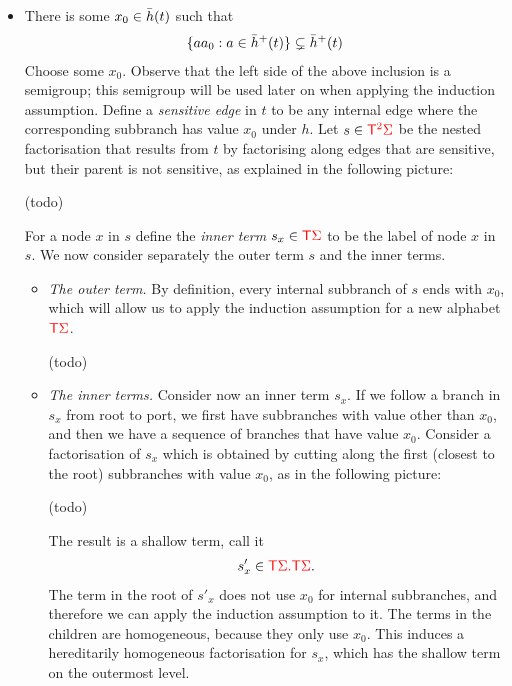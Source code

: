\begin{itemize}
    \item There is some $x_0 \in \bar h(t)$ such that 
    \begin{align}\label{eq:smaller-semigroup}
         \{ a a_0 :  a \in \bar h^+(t)\} \subsetneq  \bar h^+(t)
    \end{align}
    Choose some $x_0$. Observe that the left side of the above inclusion is a semigroup; this semigroup will be used later on when applying the induction assumption. Define a \emph{sensitive edge} in $t$ to be any internal edge where the corresponding subbranch has value $x_0$ under  $h$. Let $s \in {\color{red}{\mathsf T}}^{{\color{red}{2}}} {\color{red}{\Sigma}}$ be the nested factorisation that results from $t$ by factorising along edges that are sensitive, but their parent is not sensitive, as explained in the following picture:
    \begin{center}
        (todo)
    \end{center}
    For a node  $x$ in $s$ define the \emph{inner term} $s_x \in {\color{red}{\mathsf T}}  {\color{red}{\Sigma}}$ to be the label of node $x$ in $s$. We now consider separately the outer term $s$ and the inner terms.
    \begin{itemize}
        \item \emph{The outer term.} By definition, every internal subbranch of $s$ ends with $x_0$, which will allow us to apply the induction assumption for a new alphabet ${\color{red}{\mathsf T}} {\color{red}{\Sigma}}$. 
     \begin{center}
            (todo)
        \end{center}
        
    \item \emph{The inner terms.} Consider now an inner term $s_x$. If we follow a  branch in $s_x$ from root to port, we first  have subbranches with value other than $x_0$, and then we have a sequence of branches that have value $x_0$. Consider a factorisation of $s_x$ which is obtained by cutting along the first (closest to the root) subbranches with value $x_0$, as in the following picture:
    \begin{center}
        (todo)
    \end{center}
    The result is a shallow term, call it 
    \begin{align*}
    s'_x \in {\color{red}{{\color{red}{\mathsf T}}{\color{red}{\Sigma}}. {\color{red}{\mathsf T}}{\color{red}{\Sigma}}}}.
    \end{align*}
    The term in the root of $s'_x$ does not use $x_0$ for internal subbranches, and therefore we can apply the induction assumption to it. The terms in the children are homogeneous, because they only use $x_0$. This induces a hereditarily homogeneous factorisation for $s_x$, which has the shallow term on the outermost level. 
    \end{itemize}
    

\end{itemize}
